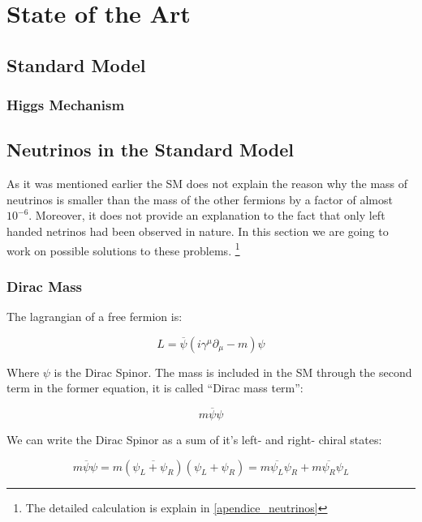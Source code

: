 \chapter{State of the Art} 

\section{Standard Model}

\subsection{Higgs Mechanism}

\section{Neutrinos in the Standard Model}

As it was mentioned earlier the SM does not explain the reason why the mass of neutrinos is smaller than the mass of the other fermions by a factor of almost $10^{-6}$. Moreover, it does not
provide an explanation to the fact that only left handed netrinos had been observed in nature. 
In this section we are going to work on possible solutions to these problems. \footnote{The detailed calculation is explain in \ref{apendice_neutrinos}}

\subsection{Dirac Mass}
The lagrangian of a free fermion is:

\begin{equation}
 L = \overline{\psi} \left( i \gamma ^\mu \partial_{\mu} - m \right) \psi
\end{equation}

Where $\psi$ is the Dirac Spinor. The mass is included in the SM through the second term in the former equation, it is called ``Dirac mass term'':

\begin{equation}
 m \overline{\psi} \psi
\end{equation}

We can write the Dirac Spinor as a sum of it's left- and right- chiral states:

\begin{equation}\label{Dirac mass term}
 m \overline{\psi} \psi = m \left( \overbar{\psi_L + \psi_R} \right) \left( \psi_L + \psi_R \right) = m \overline{\psi_L} \psi_R + m \overline{\psi_R}\psi_L
\end{equation} 

